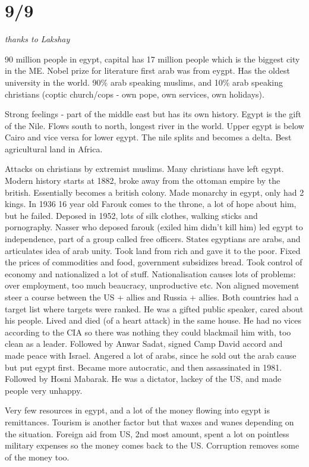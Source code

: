 \documentclass[12pt]{article}
\begin{document}
\section{9/9}

\textit{thanks to Lakshay}

90 million people in egypt, capital has 17 million people which is the biggest city in the ME. Nobel prize for literature first arab was from eygpt. Has the oldest university in the world. 90\% arab speaking muslims, and 10\% arab speaking christians (coptic church/cops - own pope, own services, own holidays). 

Strong feelings - part of the middle east but has its own history. Egypt is the gift of the Nile. Flows south to north, longest river in the world. Upper egypt is below Cairo and vice versa for lower egypt. The nile splits and becomes a delta. Best agricultural land in Africa.

Attacks on christians by extremist muslims. Many christians have left egypt. Modern history starts at 1882, broke away from the ottoman empire by the british. Essentially becomes a british colony. Made monarchy in egypt, only had 2 kings. In 1936 16 year old Farouk comes to the throne, a lot of hope about him, but he failed. Deposed in 1952, lots of silk clothes, walking sticks and pornography. Nasser who deposed farouk (exiled him didn't kill him) led egypt to independence, part of a group called free officers.  States egyptians are arabs, and articulates idea of arab unity. Took land from rich and gave it to the poor. Fixed the prices of commodities and food, government subsidizes bread. Took control of economy and nationalized a lot of stuff. Nationalisation causes lots of problems: over employment, too much beaucracy, unproductive etc. Non aligned movement steer a course between the US + allies and Russia + allies. Both countries had a target list where targets were ranked. He was a gifted public speaker, cared about his people. Lived and died (of a heart attack) in the same house. He had no vices according to the CIA so there was nothing they could blackmail him with, too clean as a leader. Followed by Anwar Sadat, signed Camp David accord and made peace with Israel. Angered a lot of arabs, since he sold out the arab cause but put egypt first. Became more autocratic, and then assassinated in 1981. Followed by Hosni Mabarak. He was a dictator, lackey of the US, and made people very unhappy.  

Very few resources in egypt, and a lot of the money flowing into egypt is remittances. Tourism is another factor but that waxes and wanes depending on the situation. Foreign aid from US, 2nd most amount, spent a lot on pointless military expenses so the money comes back to the US. Corruption removes some of the money too. 
\end{document}
